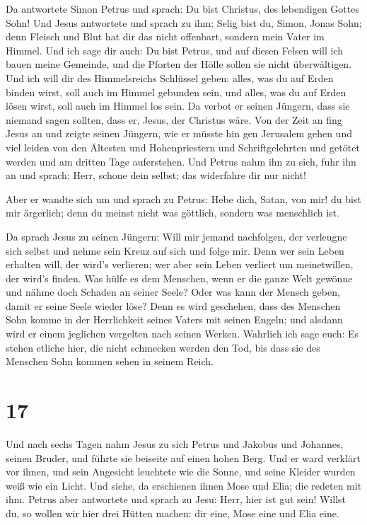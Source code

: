  Da antwortete Simon Petrus und sprach: Du bist Christus,
des lebendigen Gottes Sohn!  Und Jesus antwortete und
sprach zu ihm: Selig bist du, Simon, Jonas Sohn; denn Fleisch und Blut
hat dir das nicht offenbart, sondern mein Vater im Himmel.
 Und ich sage dir auch: Du bist Petrus, und auf diesen
Felsen will ich bauen meine Gemeinde, und die Pforten der Hölle sollen
sie nicht überwältigen.  Und ich will dir des
Himmelsreichs Schlüssel geben: alles, was du auf Erden binden wirst,
soll auch im Himmel gebunden sein, und alles, was du auf Erden lösen
wirst, soll auch im Himmel los sein.  Da verbot er seinen
Jüngern, dass sie niemand sagen sollten, dass er, Jesus, der Christus
wäre.  Von der Zeit an fing Jesus an und zeigte seinen
Jüngern, wie er müsste hin gen Jerusalem gehen und viel leiden von den
Ältesten und Hohenpriestern und Schriftgelehrten und getötet werden und
am dritten Tage auferstehen.  Und Petrus nahm ihn zu
sich, fuhr ihn an und sprach: Herr, schone dein selbst; das widerfahre
dir nur nicht!

 Aber er wandte sich um und sprach zu Petrus: Hebe dich,
Satan, von mir! du bist mir ärgerlich; denn du meinst nicht was
göttlich, sondern was menschlich ist.

 Da sprach Jesus zu seinen Jüngern: Will mir jemand
nachfolgen, der verleugne sich selbst und nehme sein Kreuz auf sich und
folge mir.  Denn wer sein Leben erhalten will, der wird's
verlieren; wer aber sein Leben verliert um meinetwillen, der wird's
finden.  Was hülfe es dem Menschen, wenn er die ganze
Welt gewönne und nähme doch Schaden an seiner Seele? Oder was kann der
Mensch geben, damit er seine Seele wieder löse?  Denn es
wird geschehen, dass des Menschen Sohn komme in der Herrlichkeit seines
Vaters mit seinen Engeln; und alsdann wird er einem jeglichen vergelten
nach seinen Werken.  Wahrlich ich sage euch: Es stehen
etliche hier, die nicht schmecken werden den Tod, bis dass sie des
Menschen Sohn kommen sehen in seinem Reich.

\hypertarget{section-16}{%
\section{17}\label{section-16}}

 Und nach sechs Tagen nahm Jesus zu sich Petrus und
Jakobus und Johannes, seinen Bruder, und führte sie beiseite auf einen
hohen Berg.  Und er ward verklärt vor ihnen, und sein
Angesicht leuchtete wie die Sonne, und seine Kleider wurden weiß wie ein
Licht.  Und siehe, da erschienen ihnen Mose und Elia; die
redeten mit ihm.  Petrus aber antwortete und sprach zu
Jesu: Herr, hier ist gut sein! Willst du, so wollen wir hier drei Hütten
machen: dir eine, Mose eine und Elia eine.

